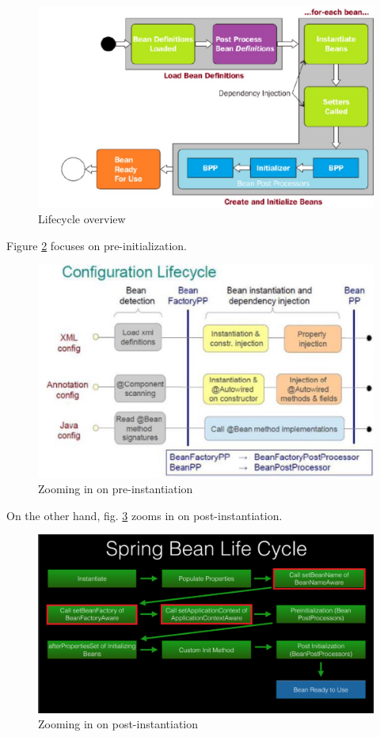 \documentclass{scrartcl}
\begin{document}
\begin{figure}
    \centering
    \includegraphics[width=1\linewidth]{bean-lifecycle-3}
    \caption{Lifecycle overview}
    \label{fig:bean-lifecycle-3}
\end{figure}

Figure \ref{fig:bean-lifecycle-2} focuses on pre-initialization.

\begin{figure}
    \centering
    \includegraphics[width=1\linewidth]{bean-lifecycle-2}
    \caption{Zooming in on pre-instantiation}
    \label{fig:bean-lifecycle-2}
\end{figure}

On the other hand, fig. \ref{fig:bean-lifecycle-1} zooms in on post-instantiation.

\begin{figure}
    \centering
    \includegraphics[width=1\linewidth]{bean-lifecycle-1}
    \caption{Zooming in on post-instantiation}
    \label{fig:bean-lifecycle-1}
\end{figure}
\end{document}
